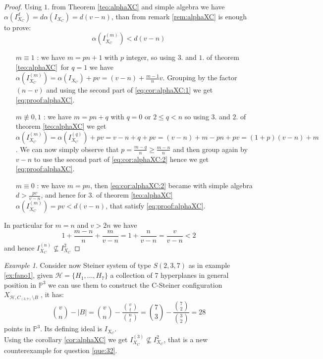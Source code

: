 \documentclass[notitlepage, a4]{book}
\theoremstyle{plain}
\theoremstyle{remark}
\newtheorem{ex}[rem]{Example}
\theoremstyle{definition}
\newcommand{\PP}{\mathbb{P}}
\newcommand{\HH}{\mathcal{H}}
\DeclareMathOperator*{\eqb }{=}
\newcounter{que}
\begin{document}
 \begin{proof}
 Using $ 1. $ from Theorem \ref{teo:alphaXC} and simple algebra we have $ \alpha(I_{X_C}^d) = d\alpha(I_{X_C}) = d(v- n) $, than from remark \ref{rem:alphaXC} is enough to prove:
 \begin{equation}\label{eq:proof:alphaXC}
 \alpha(I_{X_C}^{(m)}) < d(v-n)
 \end{equation}
 \begin{itemize}
 \item[$m \equiv 1$ : ] we have $ m = pn + 1 $ with $ p $ integer, so using $ 3. $ and $ 1. $ of theorem \ref{teo:alphaXC} for $ q = 1 $ we have $  \alpha(I_{X_C}^{(m)}) \eqb \alpha(I_{X_C} ) + pv \eqb (v-n) + \frac{m-1}{n}v  $. Grouping by the factor $ (n-v) $ and using the second part of \ref{eq:cor:alphaXC:1} we get \ref{eq:proof:alphaXC}. 
 \item[$m \not\equiv 0,1$ : ] we have $ m = pn + q $ with $ q = 0 $ or $ 2 \leq q < n $ so using $ 3. $ and $ 2. $ of theorem \ref{teo:alphaXC} we get  $  \alpha(I_{X_C}^{(m)}) \eqb \alpha(I_{X_C}^{(q)} ) + pv \eqb v - n + q  +pv = (v - n) + m -pn +pv = (1 + p)(v - n) + m $. We can now simply observe that $ p = \frac{m-q}{n} \geq \frac{m-n}{n} $ and then group again by $ v-n $ to use the second part of \ref{eq:cor:alphaXC:2} hence we get \ref{eq:proof:alphaXC}.
 \item[$ m\equiv 0 $ : ] we have $ m=pn $, then \ref{eq:cor:alphaXC:2} became with simple algebra $ d > \frac{pv}{v-n} $, and hence for $ 3. $ of theorem \ref{teo:alphaXC} $  \alpha(I_{X_C}^{(m)})= pv < d(v-n)$, that satisfy \ref{eq:proof:alphaXC}. 
 \end{itemize}
 In particular for $ m=n $ and $ v > 2n $ we have 
 \[ 1 +\frac{ m - n }{ n } + \frac{ m }{ v - n } = 1 + \frac{ n }{ v - n }= \frac{ v }{ v - n } < 2 \]
 and hence $ I_{X_C}^{(n)} \not \subseteq I_{X_C}^2  $
 \end{proof}
 
 \begin{ex}\label{ex:fano2}
 Consider now Steiner system of type $ S(2,3,7) $ as in example \ref{ex:fano1}, given $ \HH = \{ H_1 , ... , H_7 \} $ a collection of 7 hyperplanes in general position in $ \PP^3 $ we can use them to construct the C-Steiner configuration $ X_{\HH , C_{(3,7)} \setminus B} $ , it has:
 \[
 \binom{v}{n} - |B| = \binom{v}{n} -  \frac{\binom{v}{t}}{\binom{n}{t}} = \binom{7}{3} -  \frac{\binom{7}{2}}{\binom{3}{2}} = 28
 \]
 points in $ \PP^3 $. Its defining ideal is  $ I_{X_C} $. \\
 Using the corollary \ref{cor:alphaXC} we get $ I_{X_C}^{(3)}  \not \subseteq I_{X_C}^2$, that is a new counterexample for question \ref{que:32}. 
 \end{ex}
 
\end{document}
